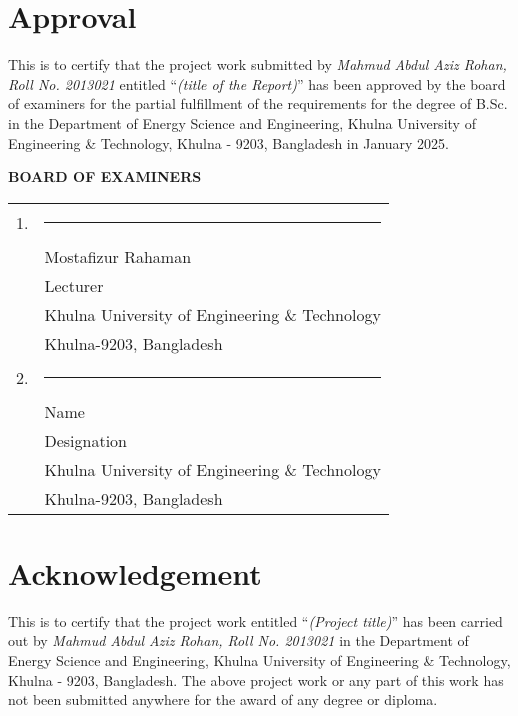 \documentclass[12pt,a4paper]{report}
\begin{document}
\chapter*{Approval}
\begin{spacing}{1.5}
\noindent This is to certify that the project work submitted by \textit{Mahmud
Abdul Aziz Rohan, Roll No. 2013021} entitled ``\textit{(title of the Report)}''
has been approved by the board of examiners for the partial fulfillment of the
requirements for the degree of B.Sc. in the Department of Energy Science and
Engineering, Khulna University of Engineering \& Technology, Khulna - 9203, Bangladesh in January 2025.

\vspace{3\baselineskip}
{\centering\fontsize{14}{16}\selectfont\textbf{BOARD OF EXAMINERS}\par}

\vspace{3\baselineskip}
\noindent\begin{tabular}{@{}p{}@{}p{}@{}}
1. & \rule{0.8\textwidth}{0.4pt}\\
& Mostafizur Rahaman\\
& Lecturer\\
& Khulna University of Engineering \& Technology\\
& Khulna-9203, Bangladesh\\[2\baselineskip]
2. & \rule{0.8\textwidth}{0.4pt}\\
& Name\\
& Designation\\
& Khulna University of Engineering \& Technology\\
& Khulna-9203, Bangladesh
\end{tabular}
\end{spacing}

\chapter*{Acknowledgement}
\begin{spacing}{1.5}
\noindent This is to certify that the project work entitled ``\textit{(Project title)}'' has been carried out by \textit{Mahmud Abdul Aziz Rohan, Roll No. 2013021} in the Department of Energy Science and Engineering, Khulna University of Engineering \& Technology, Khulna - 9203, Bangladesh. The above project work or any part of this work has not been submitted anywhere for the award of any degree or diploma.
\end{spacing}
\end{document}
